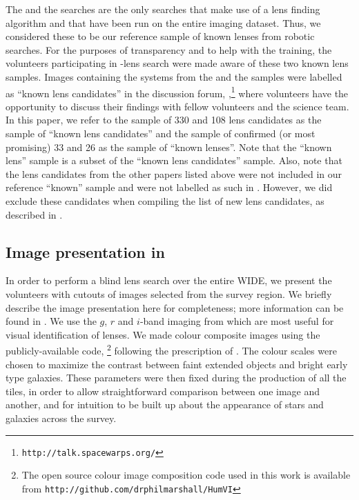 \documentclass[useAMS,usenatbib,a4paper]{mn2e}
\begin{document}
The \rf and the \af searches are the only searches that make use of a
lens finding algorithm and that have been run on the entire \cfhtls
imaging dataset.  Thus, we considered these to be our reference sample of known
lenses from robotic searches. For the purposes of transparency and to
help with the training, the volunteers participating in \sw-\cfhtls lens
search were made aware of these two known lens samples. Images
containing the systems from the \rf and the \af samples were labelled as
``known lens candidates'' in the \sw discussion forum,
\Talk,\footnote{\texttt{http://talk.spacewarps.org/}} where volunteers have the
opportunity to discuss their findings with fellow volunteers and the
science team. In this paper, we refer to the sample of 330 \rf and 108
\af lens candidates as the sample of ``known lens candidates'' and the
sample of confirmed (or most promising) 33 \rf and 26 \af as the sample
of ``known lenses''. Note that the ``known lens'' sample is a subset of
the ``known lens candidates'' sample. Also, note that the lens
candidates from the other papers listed above were not included in our
reference ``known'' sample and were not labelled as such in \Talk.
However, we did exclude these candidates when compiling the list of new
\sw lens candidates, as described in .


\subsection{Image presentation in \sw}
\label{sec:data:impres}

In order to perform a blind lens search over the entire \cfhtls
WIDE, we present the volunteers with cutouts of images selected
from the survey region. We briefly describe the image presentation here
for completeness; more information can be found in \PaperOne. We use
the $g$, $r$ and $i$-band imaging from \cfhtls which are most useful for
visual identification of lenses.  We made colour composite images using
the publicly-available code, \humvi\footnote{The open source  colour image
composition code used in this work is available from
\texttt{http://github.com/drphilmarshall/HumVI}} following the
prescription of \citet{Lupton2004}. The colour scales were chosen to
maximize the contrast between faint extended objects and bright early
type galaxies. These parameters
were then fixed during the production of all the tiles, in order to allow
straightforward comparison between one image and another, and for
intuition to be built up about the appearance of stars and galaxies
across the survey.
\end{document}
